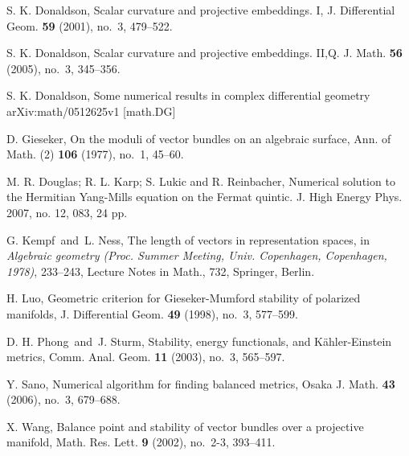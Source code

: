 \documentclass[12pt,oneside,notitlepage]{amsart}
\theoremstyle{definition}
\theoremstyle{remark}
\numberwithin{equation}{section}
\begin{document}
\begin{thebibliography}{HHHH}

S. K. Donaldson, Scalar curvature and projective embeddings. I, J. Differential Geom. {\bf 59} (2001), no.~3, 479--522.

S. K. Donaldson, Scalar curvature and projective embeddings. II,Q. J. Math. {\bf 56} (2005), no.~3, 345--356.

S. K. Donaldson, Some numerical results in complex differential geometry     arXiv:math/0512625v1 [math.DG]

D. Gieseker, On the moduli of vector bundles on an algebraic surface, Ann. of Math. (2) {\bf 106} (1977), no.~1, 45--60.

 M. R. Douglas; R. L. Karp; S. Lukic and R. Reinbacher,  Numerical solution to the Hermitian Yang-Mills equation on the Fermat quintic. J. High Energy Phys.  2007,  no. 12, 083, 24 pp.

G. Kempf\ and\ L. Ness, The length of vectors in representation spaces, in {\it Algebraic geometry (Proc. Summer Meeting, Univ. Copenhagen, Copenhagen, 1978)}, 233--243, Lecture Notes in Math., 732, Springer, Berlin.

H. Luo, Geometric criterion for Gieseker-Mumford stability of polarized manifolds, J. Differential Geom. {\bf 49} (1998), no.~3, 577--599.

 D. H. Phong\ and\ J. Sturm, Stability, energy functionals, and K\"ahler-Einstein metrics, Comm. Anal. Geom. {\bf 11} (2003), no.~3, 565--597.

 Y. Sano, Numerical algorithm for finding balanced metrics, Osaka J. Math. {\bf 43} (2006), no.~3, 679--688.

X. Wang, Balance point and stability of vector bundles over a projective manifold, Math. Res. Lett. {\bf 9} (2002), no.~2-3, 393--411.

\end{thebibliography}
\end{document}
